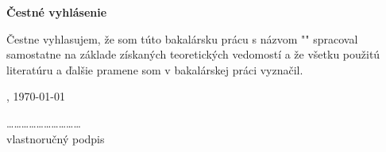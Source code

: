 \thispagestyle{empty}
\vspace*{0.75\textheight}

\noindent
\begin{flushleft}
	\textbf{
		\large
		Čestné vyhlásenie
	}
\end{flushleft}

Čestne vyhlasujem, že som túto bakalársku prácu s názvom "\thesisname" spracoval samostatne na základe získaných teoretických vedomostí a že všetku použitú literatúru a ďalšie pramene som v bakalárskej práci vyznačil.

\vspace*{10pt}

\noindent
\begin{minipage}{0.5\textwidth}
	\begin{flushleft}
		\expandafter\cityofpublishing, \today
	\end{flushleft}
\end{minipage}
\begin{minipage}{0.5\textwidth}
	\begin{flushright}
		\vspace*{30pt}
		\dots\dots\dots\dots\dots\dots\dots\dots\dots\dots\\
		vlastnoručný podpis
	\end{flushright}
\end{minipage}

\newpage